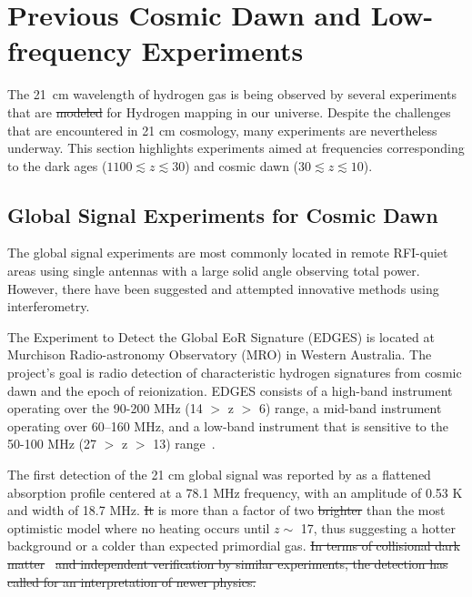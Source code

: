 \section{Previous Cosmic Dawn and Low-frequency Experiments}

The \SI{21}{cm} wavelength of hydrogen gas is being observed by several experiments that are \st{modeled}  for Hydrogen mapping in our universe. Despite the challenges that are encountered in 21 cm cosmology, many experiments are nevertheless underway. This section highlights experiments aimed at frequencies corresponding to the dark ages ($1100 \lesssim z \lesssim 30$) and cosmic dawn ($30 \lesssim z \lesssim 10$).

\subsection{Global Signal Experiments for Cosmic Dawn}

The global signal experiments are most commonly located in remote RFI-quiet areas using single antennas with a large solid angle observing total power. However, there have been suggested and attempted innovative methods using interferometry. 

The Experiment to Detect the Global EoR Signature (EDGES) is located at Murchison Radio-astronomy Observatory (MRO) in Western Australia. The project's goal is radio detection of characteristic hydrogen signatures from cosmic dawn and the epoch of reionization. EDGES consists of a high-band instrument operating over the 90-200 MHz (14 $>$ z $>$ 6) range, a mid-band instrument operating over 60–160 MHz, and a low-band instrument that is sensitive to the 50-100 MHz (27 $>$ z $>$ 13) range~\citep{2017ApJ...835...49M}. 

The first detection of the 21 cm global signal was reported by \citet{2018Natur.555...67B} as a flattened absorption profile centered at a 78.1 MHz frequency, with an amplitude of 0.53 K and width of 18.7 MHz. \st{It}  is more than a factor of two  \st{brighter} than the most optimistic model where no heating occurs until $z \sim$ 17, thus suggesting a hotter background or a colder than expected primordial gas.  \st{In terms of collisional dark matter}~\citet{2018Natur.555...71B, PhysRevD.98.103005} \st{and independent verification by similar experiments, the detection has called for an interpretation of newer physics.} 

